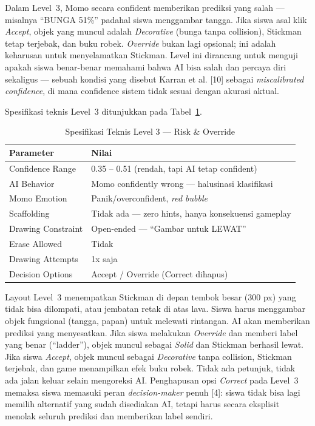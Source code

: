 \documentclass[12pt,oneside]{report}
\begin{document}
Dalam Level~3, Momo secara confident memberikan prediksi yang salah --- misalnya ``BUNGA 51\%'' padahal siswa menggambar tangga. Jika siswa asal klik \textit{Accept}, objek yang muncul adalah \textit{Decorative} (bunga tanpa collision), Stickman tetap terjebak, dan buku robek. \textit{Override} bukan lagi opsional; ini adalah keharusan untuk menyelamatkan Stickman. Level ini dirancang untuk menguji apakah siswa benar-benar memahami bahwa AI bisa salah dan percaya diri sekaligus --- sebuah kondisi yang disebut Karran et al. [10] sebagai \textit{miscalibrated confidence}, di mana confidence sistem tidak sesuai dengan akurasi aktual.

Spesifikasi teknis Level~3 ditunjukkan pada Tabel~\ref{tab:level3-spec}.

\begin{table}[H]
\centering
\caption{Spesifikasi Teknis Level 3 --- Risk \& Override}
\label{tab:level3-spec}
\begin{tabular}{|l|l|}
\hline
\textbf{Parameter} & \textbf{Nilai} \\ \hline
Confidence Range & 0.35 -- 0.51 (rendah, tapi AI tetap confident) \\ \hline
AI Behavior & Momo confidently wrong --- halusinasi klasifikasi \\ \hline
Momo Emotion & Panik/overconfident, \textit{red bubble} \\ \hline
Scaffolding & Tidak ada --- zero hints, hanya konsekuensi gameplay \\ \hline
Drawing Constraint & Open-ended --- ``Gambar untuk LEWAT'' \\ \hline
Erase Allowed & Tidak \\ \hline
Drawing Attempts & 1x saja \\ \hline
Decision Options & Accept / Override (Correct dihapus) \\ \hline
\end{tabular}
\end{table}

Layout Level~3 menempatkan Stickman di depan tembok besar (300 px) yang tidak bisa dilompati, atau jembatan retak di atas lava. Siswa harus menggambar objek fungsional (tangga, papan) untuk melewati rintangan. AI akan memberikan prediksi yang menyesatkan. Jika siswa melakukan \textit{Override} dan memberi label yang benar (``ladder''), objek muncul sebagai \textit{Solid} dan Stickman berhasil lewat. Jika siswa \textit{Accept}, objek muncul sebagai \textit{Decorative} tanpa collision, Stickman terjebak, dan game menampilkan efek buku robek. Tidak ada petunjuk, tidak ada jalan keluar selain mengoreksi AI. Penghapusan opsi \textit{Correct} pada Level~3 memaksa siswa memasuki peran \textit{decision-maker} penuh [4]: siswa tidak bisa lagi memilih alternatif yang sudah disediakan AI, tetapi harus secara eksplisit menolak seluruh prediksi dan memberikan label sendiri.
\end{document}
